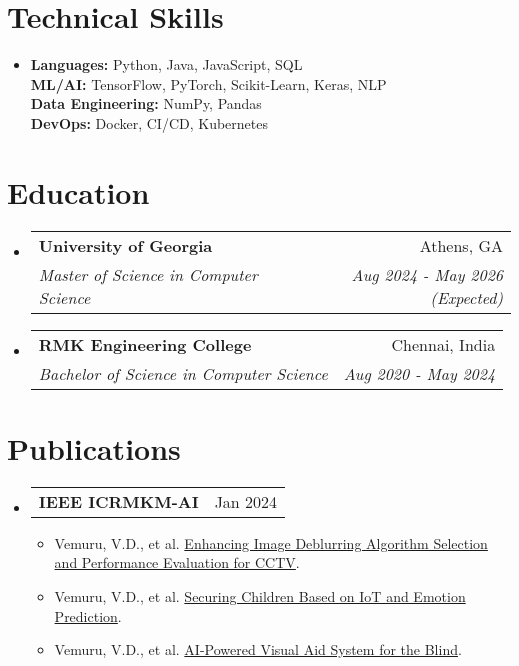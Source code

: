 \documentclass[letterpaper,10pt]{article}
\makeatletter
\newcommand{\resumeItem}[1]{
  \item\small{
    {#1 \vspace{-3pt}}
  }
}
\newcommand{\resumeSubheading}[4]{
  \vspace{-2pt}\item
    \begin{tabular*}{0.97\textwidth}{l@{\extracolsep{\fill}}r}
      \textbf{#1} & #2 \\
      \textit{\small#3} & \textit{\small #4} \\
    \end{tabular*}\vspace{-6pt}
}
\newcommand{\resumePublicationsHeading}[2]{
    \item
    \begin{tabular*}{0.97\textwidth}{l@{\extracolsep{\fill}}r}
      \small#1 & #2 \\
    \end{tabular*}\vspace{-6pt}
}
\newcommand{\resumeSubHeadingListStart}{\begin{itemize}[leftmargin=*]}
\newcommand{\resumeSubHeadingListEnd}{\end{itemize}}
\newcommand{\resumeItemListStart}{\begin{itemize}}
\newcommand{\resumeItemListEnd}{\end{itemize}\vspace{-6pt}}
\makeatother
\begin{document}
\section{Technical Skills}
 \begin{itemize}[leftmargin=0.15in, label={}]
    \item{
     \textbf{Languages:} Python, Java, JavaScript, SQL \\
     \textbf{ML/AI:} TensorFlow, PyTorch, Scikit-Learn, Keras, NLP \\
     \textbf{Data Engineering:} NumPy, Pandas \\
     \textbf{DevOps:} Docker, CI/CD, Kubernetes \\
    }
 \end{itemize}


\section{Education}
  \resumeSubHeadingListStart
    \resumeSubheading
      {University of Georgia}{Athens, GA}
      {Master of Science in Computer Science}{Aug 2024 - May 2026 (Expected)}
    \resumeSubheading
      {RMK Engineering College}{Chennai, India}
      {Bachelor of Science in Computer Science}{Aug 2020 - May 2024}
  \resumeSubHeadingListEnd

\section{Publications}
    \resumeSubHeadingListStart
      \resumePublicationsHeading
          {\textbf{IEEE ICRMKM-AI}}{Jan 2024}
          \resumeItemListStart
            \resumeItem{Vemuru, V.D., et al. \href{https://ieeexplore.ieee.org/document/10369555}{Enhancing Image Deblurring Algorithm Selection and Performance Evaluation for CCTV}.}
            \resumeItem{Vemuru, V.D., et al. \href{https://ieeexplore.ieee.org/document/10369553}{Securing Children Based on IoT and Emotion Prediction}.}
            \resumeItem{Vemuru, V.D., et al. \href{https://ieeexplore.ieee.org/document/10368901}{AI-Powered Visual Aid System for the Blind}.}
          \resumeItemListEnd
    \resumeSubHeadingListEnd
\end{document}
